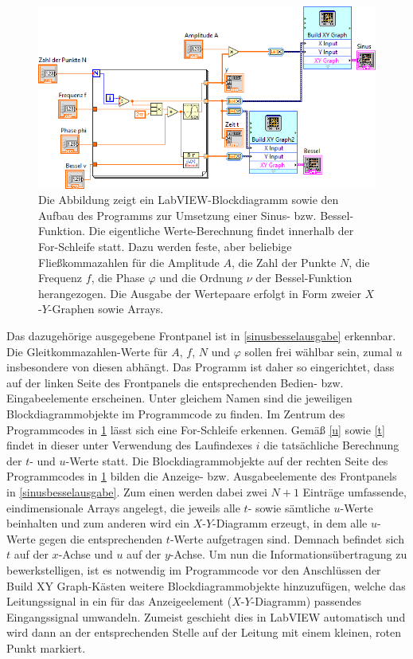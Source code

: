 \documentclass[
a4paper,
12pt,
pagesize,
ngerman
]{scrartcl}
\begin{document}
	\begin{figure}[H]
		\centering
		\includegraphics[width=1.0\textwidth]{EIRE2018Dateien/Tag1/sinusbessel-bilder/SinusBesseld}
		\caption{Die Abbildung zeigt ein LabVIEW-Blockdiagramm sowie den Aufbau des Programms zur Umsetzung einer Sinus- bzw. Bessel-Funktion. Die eigentliche Werte-Berechnung findet innerhalb der For-Schleife statt. Dazu werden feste, aber beliebige Fließkommazahlen für die Amplitude $A$, die Zahl der Punkte $N$, die Frequenz $f$, die Phase $\varphi$ und die Ordnung $\nu$ der Bessel-Funktion herangezogen. Die Ausgabe der Wertepaare erfolgt in Form zweier $X$-$Y$-Graphen sowie Arrays.}
		\label{sinusbesselprogrammcode}
	\end{figure}

	\noindent Das dazugehörige ausgegebene Frontpanel ist in \cref{sinusbesselausgabe} erkennbar. Die Gleitkommazahlen-Werte für $A$, $f$, $N$ und $\varphi$ sollen frei wählbar sein, zumal $u$ insbesondere von diesen abhängt. Das Programm ist daher so eingerichtet, dass auf der linken Seite des Frontpanels die entsprechenden Bedien- bzw. Eingabeelemente erscheinen. Unter gleichem Namen sind die jeweiligen Blockdiagrammobjekte im Programmcode zu finden. Im Zentrum des Programmcodes in \cref{sinusbesselprogrammcode} lässt sich eine For-Schleife erkennen. Gemäß \cref{u} sowie \cref{t} findet in dieser unter Verwendung des Laufindexes $i$ die tatsächliche Berechnung der $t$- und $u$-Werte statt. Die Blockdiagrammobjekte auf der rechten Seite des Programmcodes in \cref{sinusbesselprogrammcode} bilden die Anzeige- bzw. Ausgabeelemente des Frontpanels in \cref{sinusbesselausgabe}. Zum einen werden dabei zwei $N+1$ Einträge umfassende, eindimensionale Arrays angelegt, die jeweils alle $t$- sowie sämtliche $u$-Werte beinhalten und zum anderen wird ein $X$-$Y$-Diagramm erzeugt, in dem alle $u$-Werte gegen die entsprechenden $t$-Werte aufgetragen sind. Demnach befindet sich $t$ auf der $x$-Achse und $u$ auf der $y$-Achse. Um nun die Informationsübertragung zu bewerkstelligen, ist es notwendig im Programmcode vor den Anschlüssen der \glqq Build XY Graph\grqq -Kästen weitere Blockdiagrammobjekte hinzuzufügen, welche das Leitungssignal in ein für das Anzeigeelement ($X$-$Y$-Diagramm) passendes Eingangssignal umwandeln. Zumeist geschieht dies in LabVIEW automatisch und wird dann an der entsprechenden Stelle auf der Leitung mit einem kleinen, roten Punkt markiert.
			
\end{document}
